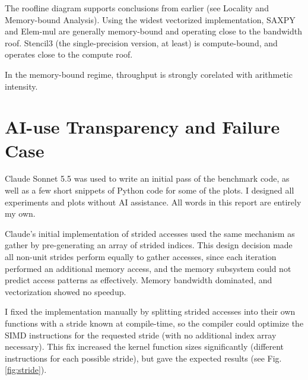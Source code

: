 \documentclass[12pt]{article}
\begin{document}
The roofline diagram supports conclusions from earlier (see Locality and
Memory-bound Analysis). Using the widest vectorized implementation, SAXPY and
Elem-mul are generally memory-bound and operating close to the bandwidth roof.
Stencil3 (the single-precision version, at least) is compute-bound, and
operates close to the compute roof.

In the memory-bound regime, throughput is strongly corelated with arithmetic
intensity.

\newpage
\section*{AI-use Transparency and Failure Case}

Claude Sonnet 5.5 was used to write an initial pass of the benchmark code, as
well as a few short snippets of Python code for some of the plots. I designed
all experiments and plots without AI assistance. All words in this report are
entirely my own.

Claude's initial implementation of strided accesses used the same mechanism as
gather by pre-generating an array of strided indices. This design decision made
all non-unit strides perform equally to gather accesses, since each iteration
performed an additional memory access, and the memory subsystem could not
predict access patterns as effectively. Memory bandwidth dominated, and
vectorization showed no speedup.

I fixed the implementation manually by splitting strided accesses into their
own functions with a stride known at compile-time, so the compiler could
optimize the SIMD instructions for the requested stride (with no additional
index array necessary). This fix increased the kernel function sizes
significantly (different instructions for each possible stride), but gave the
expected results (see Fig. \ref{fig:stride}).

% 
% 
\end{document}
